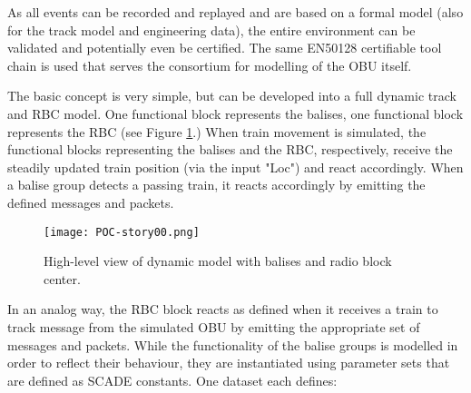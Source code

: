 As all events can be recorded and replayed and are based on a formal model (also for the track model and engineering data), the entire environment can be validated and potentially even be certified.
The same EN50128 certifiable tool chain is used that serves the consortium for modelling of the OBU itself.

The basic concept is very simple, but can be developed into a full dynamic track and RBC model. One functional block represents the balises, one functional block represents the RBC (see Figure \ref{fig:track-story00}.) When train movement is simulated, the functional blocks representing the balises and the RBC, respectively, receive the steadily updated train position (via the input "Loc") and react accordingly.
When a balise group detects a passing train, it reacts accordingly by emitting the defined messages and packets.
\begin{figure}
  \centering
  \texttt{[image: POC-story00.png]}
  \caption{High-level view of dynamic model with balises and radio block center.}
  \label{fig:track-story00}
\end{figure}
 
In an analog way, the RBC block reacts as defined when it receives a train to track message from the simulated OBU by emitting the appropriate set of messages and packets. While the functionality of the balise groups is modelled in order to reflect their behaviour, they are instantiated using parameter sets that are defined as SCADE constants. One dataset each defines:

